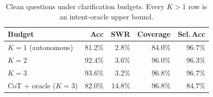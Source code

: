 \documentclass[sigconf]{acmart}
\newcommand{\vqAccAll}{93.6\%}
\newcommand{\vqCovAll}{96.8\%}
\newcommand{\vqSelAccAll}{96.7\%}
\newcommand{\vqSWRAll}{3.2\%}
\newcommand{\cotoAccAll}{82.0\%}
\newcommand{\cotoSWRAll}{14.8\%}
\newcommand{\cotoSelAccAll}{84.7\%}
\newcommand{\cotoCovAll}{96.8\%}          %
\begin{document}
\begin{table}[t]
\caption{Clean questions under clarification budgets. Every $K{>}1$ row is an intent-oracle upper bound.}
\label{tab:v2kabl}
\small
\begin{tabular}{@{}lrrrr@{}}
\toprule
Budget & Acc & SWR & Coverage & Sel.\,Acc \\
\midrule
$K{=}1$ (autonomous) & 81.2\% & 2.8\% & 84.0\% & 96.7\% \\
$K{=}2$ & 92.4\% & 3.6\% & 96.0\% & 96.3\% \\
$K{=}3$ & \vqAccAll{} & \vqSWRAll{} & \vqCovAll{} & \vqSelAccAll{} \\
\addlinespace
CoT + oracle ($K{=}3$) & \cotoAccAll{} & \cotoSWRAll{} & \cotoCovAll{} & \cotoSelAccAll{} \\
\bottomrule
\end{tabular}
\end{table}

\end{document}
